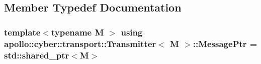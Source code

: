 \subsection{Member Typedef Documentation}
\hypertarget{classapollo_1_1cyber_1_1transport_1_1Transmitter_a1c068aab2db2d0a5ba7a26ed228b7c65}{
\subsubsection[{Message\-Ptr}]{\setlength{\rightskip}{0pt plus 5cm}template$<$typename M $>$ using {\bf apollo\-::cyber\-::transport\-::\-Transmitter}$<$ M $>$\-::{\bf Message\-Ptr} =  std\-::shared\-\_\-ptr$<$M$>$}}\label{classapollo_1_1cyber_1_1transport_1_1Transmitter_a1c068aab2db2d0a5ba7a26ed228b7c65}


